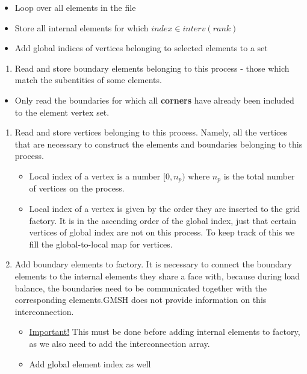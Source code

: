 \begin{mybox}
\begin{itemize}
	\item Loop over all elements in the file
	\item Store all internal elements for which $index \in interv(rank)$
	\item Add global indices of vertices belonging to selected elements to a set
\end{itemize}

\end{mybox}		


\begin{enumerate}[resume]
	\item Read and store boundary elements belonging to this process - those which match the subentities of some elements.
\end{enumerate}
\begin{mybox}
	\begin{itemize}
		\item Only read the boundaries for which all \textbf{corners} have already been included to the element vertex set. 
	\end{itemize}
\end{mybox}	

\begin{enumerate}[resume]
	\item Read and store vertices belonging to this process. Namely, all the vertices that are necessary to construct the elements and boundaries belonging to 
this process.
	\begin{itemize}
		\item Local index of a vertex is a number $[0,n_p)$ where $n_p$ is the total number of vertices on the process.
		\item Local index of a vertex is given by the order they are inserted to the grid factory. It is in the ascending order of the global index, just that certain vertices of global index are not on this process. To keep track of this we fill the global-to-local map for vertices.
	\end{itemize}

	\item Add boundary elements to factory. It is necessary to connect the boundary elements to the internal elements they share a face with, because during load balance, the boundaries need to be communicated together with the corresponding elements.GMSH does not provide information on this interconnection.
	\begin{itemize}
		\item \uline{Important!} This must be done before adding internal elements to factory, as we also need to add the interconnection array.
		\item Add global element index as well
	\end{itemize}
\end{enumerate}

